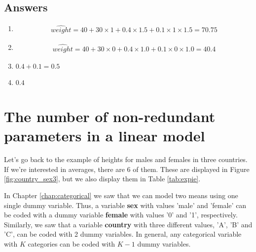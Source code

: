 \documentclass[]{book}\usepackage[]{graphicx}\usepackage[]{color}
\begin{document}
\subsection{Answers}

\begin{enumerate}

\item 
\begin{eqnarray}
\widehat{weight}= 40 + 30 \times 1 + 0.4\times 1.5 + 0.1 \times 1\times 1.5 =70.75 \nonumber
\end{eqnarray}

\item
\begin{eqnarray}
\widehat{weight}= 40 + 30 \times 0 + 0.4\times 1.0 + 0.1 \times 0\times 1.0 =40.4\nonumber
\end{eqnarray}


\item{$0.4 + 0.1 = 0.5$}

\item{$0.4$}


\end{enumerate}

\section{The number of non-redundant parameters in a linear model}

Let's go back to the example of heights for males and females in three countries. If we're interested in averages, there are 6 of them. These are displayed in Figure \ref{fig:country_sex3}, but we also display them in Table \ref{tab:expie}.

In Chapter \ref{chap:categorical} we saw that we can model two means using one single dummy variable. Thus, a variable \textbf{sex} with values 'male' and 'female' can be coded with a dummy variable \textbf{female} with values '0' and '1', respectively. Similarly, we saw that a variable \textbf{country} with three different values, 'A', 'B' and 'C', can be coded with 2 dummy variables. In general, any categorical variable with $K$ categories can be coded with $K-1$ dummy variables.

% 
\end{document}
